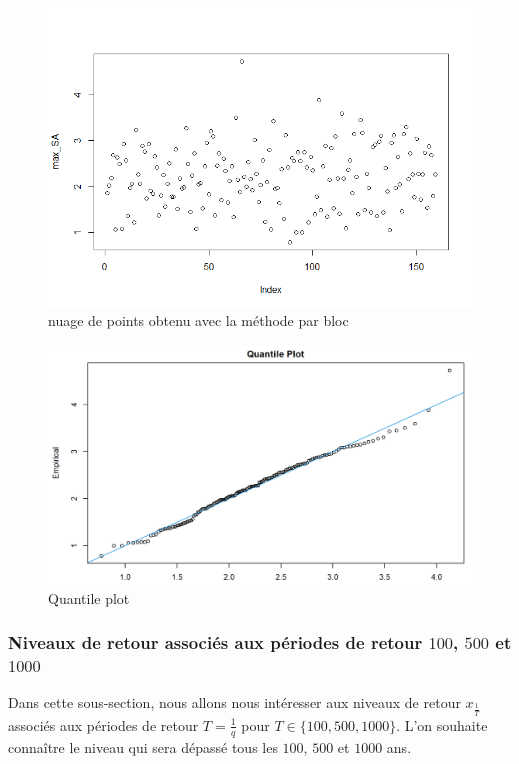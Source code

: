 \documentclass[a4paper,french,10pt]{article}
\begin{document}
 \begin{figure}[htp] 
 	\centering
 	\includegraphics[scale=0.45]{images/graph_max.png}
 	\caption{nuage de points obtenu avec la méthode par bloc}
 	\label{graph_max}
 \end{figure}

\begin{figure}[htp] 
	\centering
	\includegraphics[scale=0.45]{images/quantilePlotUnivarie.png}
	\caption{Quantile plot}
	\label{qplot}
\end{figure}

\newpage

\subsubsection{Niveaux de retour associés aux périodes de retour $100$, $500$ et $1000$}

Dans cette sous-section, nous allons nous intéresser aux niveaux de retour $x_{\frac{1}{T}}$ associés aux périodes de retour $T = \frac{1}{q}$ pour $T \in \{100,500,1000\}$. L'on souhaite connaître le niveau qui sera dépassé tous les $100$, $500$ et $1000$ ans.
\end{document}
